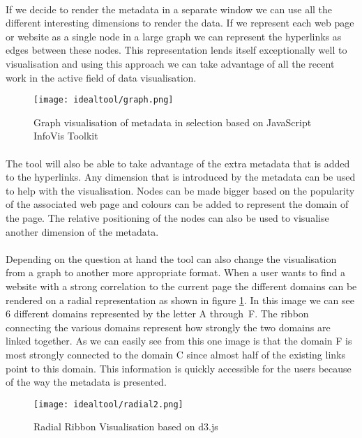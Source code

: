 	\paragraph{}
	If we decide to render the metadata in a separate window we can use all the different interesting dimensions to render the data. If we represent each web page or website as a single node in a large graph we can represent the hyperlinks as edges between these nodes. This representation lends itself exceptionally well to visualisation and using this approach we can take advantage of all the recent work in the active field of data visualisation.
	\begin{figure}[h]
		\centering
		\texttt{[image: idealtool/graph.png]}
		\caption[test]{Graph visualisation of metadata in selection based on JavaScript InfoVis Toolkit\footnotemark}
	\end{figure}
	\paragraph{}
	The tool will also be able to take advantage of the extra metadata that is added to the hyperlinks. Any dimension that is introduced by the metadata can be used to help with the visualisation. Nodes can be made bigger based on the popularity of the associated web page and colours can be added to represent the domain of the page. The relative positioning of the nodes can also be used to visualise another dimension of the metadata.
	\paragraph{}
	Depending on the question at hand the tool can also change the visualisation from a graph to another more appropriate format. When a user wants to find a website with a strong correlation to the current page the different domains can be rendered on a radial representation as shown in figure \ref{pic:radial2}. In this image we can see 6 different domains represented by the letter A through~F. The ribbon connecting the various domains represent how strongly the two domains are linked together. As we can easily see from this one image is that the domain F is most strongly connected to the domain C since almost half of the existing links point to this domain. This information is quickly accessible for the users because of the way the metadata is presented.
			\begin{figure}[h]
				\begin{centering}
				\texttt{[image: idealtool/radial2.png]}
				\caption[test]{Radial Ribbon Visualisation based on d3.js\footnotemark}
				\label{pic:radial2}
				\end{centering}
			\end{figure}
